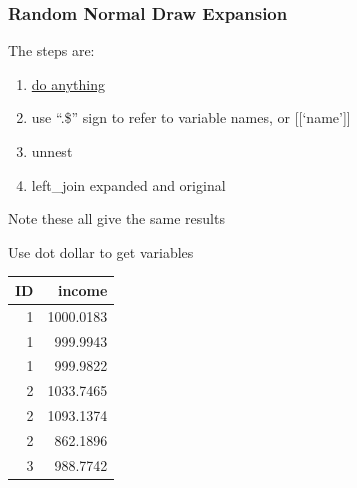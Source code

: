 \documentclass[
]{book}
\newenvironment{Shaded}{\begin{snugshade}}{\end{snugshade}}
\newcommand{\CommentTok}[1]{\textcolor[rgb]{0.56,0.35,0.01}{\textit{#1}}}
\newcommand{\DataTypeTok}[1]{\textcolor[rgb]{0.13,0.29,0.53}{#1}}
\newcommand{\KeywordTok}[1]{\textcolor[rgb]{0.13,0.29,0.53}{\textbf{#1}}}
\newcommand{\NormalTok}[1]{#1}
\newcommand{\OperatorTok}[1]{\textcolor[rgb]{0.81,0.36,0.00}{\textbf{#1}}}
\newcommand{\StringTok}[1]{\textcolor[rgb]{0.31,0.60,0.02}{#1}}
\providecommand{\tightlist}{%
  \setlength{\itemsep}{0pt}\setlength{\parskip}{0pt}}
\begin{document}
\hypertarget{random-normal-draw-expansion}{%
\subsubsection{Random Normal Draw Expansion}\label{random-normal-draw-expansion}}

The steps are:

\begin{enumerate}
\def\labelenumi{\arabic{enumi}.}
\tightlist
\item
  \href{https://dplyr.tidyverse.org/reference/do.html}{do anything}
\item
  use ``.\$'' sign to refer to variable names, or {[}{[}`name'{]}{]}
\item
  unnest
\item
  left\_join expanded and original
\end{enumerate}

Note these all give the same results

Use dot dollar to get variables

\begin{Shaded}
\end{Shaded}

\begin{table}[!h]
\centering
\begin{tabular}{r|r}
\hline
ID & income\\
\hline
\rowcolor{gray!6}  1 & 1000.0183\\
\hline
1 & 999.9943\\
\hline
\rowcolor{gray!6}  1 & 999.9822\\
\hline
2 & 1033.7465\\
\hline
\rowcolor{gray!6}  2 & 1093.1374\\
\hline
2 & 862.1896\\
\hline
\rowcolor{gray!6}  3 & 988.7742\\
\hline
\end{tabular}
\end{table}
\end{document}
